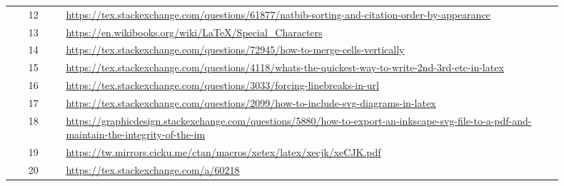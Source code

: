 \begin{center}
\begin{tabular}{ c p{0.9\linewidth} }
        12 & \url{https://tex.stackexchange.com/questions/61877/natbib-sorting-and-citation-order-by-appearance} \\
        13 & \url{https://en.wikibooks.org/wiki/LaTeX/Special_Characters} \\
        14 & \url{https://tex.stackexchange.com/questions/72945/how-to-merge-cells-vertically} \\
        15 & \url{https://tex.stackexchange.com/questions/4118/whats-the-quickest-way-to-write-2nd-3rd-etc-in-latex} \\
        16 & \url{https://tex.stackexchange.com/questions/3033/forcing-linebreaks-in-url} \\
        17 & \url{https://tex.stackexchange.com/questions/2099/how-to-include-svg-diagrams-in-latex} \\
        18 & \url{https://graphicdesign.stackexchange.com/questions/5880/how-to-export-an-inkscape-svg-file-to-a-pdf-and-maintain-the-integrity-of-the-im} \\
        19 & \url{https://tw.mirrors.cicku.me/ctan/macros/xetex/latex/xecjk/xeCJK.pdf} \\
        20 & \url{https://tex.stackexchange.com/a/60218} \\
        \bottomrule
    \end{tabular}
\end{center}
\normalsize

\clearpage
